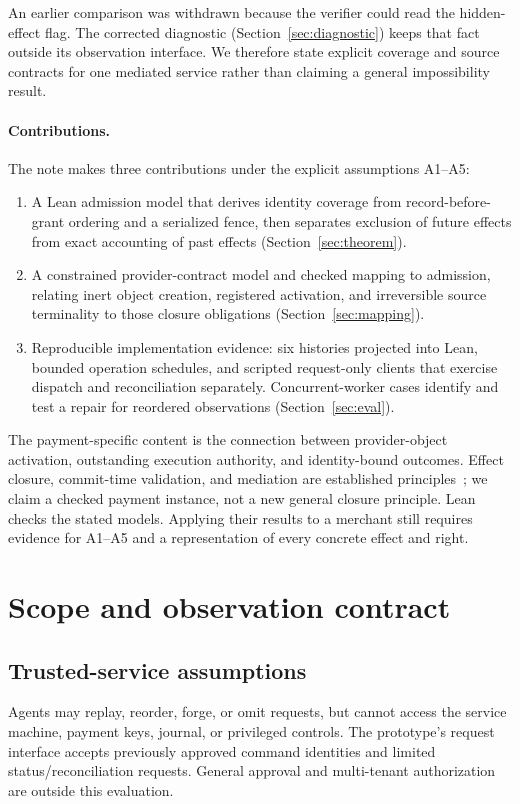 \documentclass[11pt]{article}
\begin{document}
An earlier comparison was withdrawn because the verifier could read the
hidden-effect flag. The corrected diagnostic (Section~\ref{sec:diagnostic})
keeps that fact outside its observation interface. We therefore state explicit
coverage and source contracts for one mediated service rather than claiming
a general impossibility result.

\paragraph{Contributions.}
The note makes three contributions under the explicit assumptions A1--A5:
\begin{enumerate}
\item A Lean admission model that derives identity coverage from
record-before-grant ordering and a serialized fence, then separates exclusion
of future effects from exact accounting of past effects
(Section~\ref{sec:theorem}).
\item A constrained provider-contract model and checked mapping to admission,
relating inert object creation, registered activation, and irreversible
source terminality to those closure obligations (Section~\ref{sec:mapping}).
\item Reproducible implementation evidence: six histories projected into Lean,
bounded operation schedules, and scripted request-only clients that exercise
dispatch and reconciliation separately. Concurrent-worker cases identify and test a repair for
reordered observations (Section~\ref{sec:eval}).
\end{enumerate}
The payment-specific content is the connection between provider-object
activation, outstanding execution authority, and identity-bound outcomes.
Effect closure, commit-time validation, and mediation are established
principles~\cite{effectbound,cta,salas}; we claim a checked payment instance,
not a new general closure principle. Lean~\cite{lean42021} checks the stated
models. Applying their results to a merchant still requires evidence for
A1--A5 and a representation of every concrete effect and right.

\section{Scope and observation contract}
\label{sec:scope}
\subsection{Trusted-service assumptions}
Agents may replay, reorder, forge, or omit requests, but cannot access the
service machine, payment keys, journal, or privileged controls. The prototype's
request interface accepts previously approved command identities and limited
status/reconciliation requests. General approval and multi-tenant authorization
are outside this evaluation.
\end{document}
